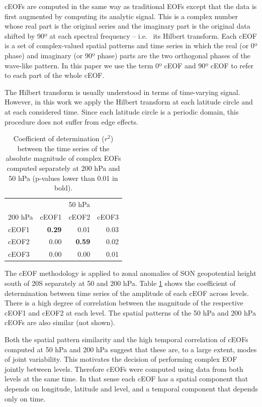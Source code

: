\documentclass[pdflatex,sn-basic]{sn-jnl}
\theoremstyle{thmstyleone}%
\theoremstyle{thmstyletwo}%
\theoremstyle{thmstylethree}%
\begin{document}
cEOFs are computed in the same way as traditional EOFs except that the data is first augmented by computing its analytic signal.
This is a complex number whose real part is the original series and the imaginary part is the original data shifted by 90º at each spectral frequency -- i.e.~
its Hilbert transform. Each cEOF is a set of complex-valued spatial patterns and time series in which the real (or 0º phase) and imaginary (or 90º phase) parts are the two orthogonal phases of the wave-like pattern.
In this paper we use the term 0º cEOF and 90º cEOF to refer to each part of the whole cEOF.

The Hilbert transform is usually understood in terms of time-varying signal.
However, in this work we apply the Hilbert transform at each latitude circle and at each considered time.
Since each latitude circle is a periodic domain, this procedure does not suffer from edge effects.



\begin{table}

\caption{\label{tab:corr-ceof-splitted}Coefficient of determination (\(r^2\)) between the time series of the absolute magnitude of complex EOFs computed separately at 200 hPa and 50 hPa (p-values lower than 0.01 in bold).}
\centering
\begin{tabular}[t]{l>{}r>{}r>{}r}
\toprule
\multicolumn{1}{c}{} & \multicolumn{3}{c}{50 hPa} \\
\cmidrule(l{3pt}r{3pt}){2-4}
200 hPa & cEOF1 & cEOF2 & cEOF3\\
\midrule
cEOF1 & \textbf{0.29} & 0.01 & 0.03\\
cEOF2 & 0.00 & \textbf{0.59} & 0.02\\
cEOF3 & 0.00 & 0.00 & 0.01\\
\bottomrule
\end{tabular}
\end{table}

The cEOF methodology is applied to zonal anomalies of SON geopotential height south of 20\degree S separately at 50 and 200 hPa.
Table \ref{tab:corr-ceof-splitted} shows the coefficient of determination between time series of the amplitude of each cEOF across levels.
There is a high degree of correlation between the magnitude of the respective cEOF1 and cEOF2 at each level.
The spatial patterns of the 50 hPa and 200 hPa cEOFs are also similar (not shown).

Both the spatial pattern similarity and the high temporal correlation of cEOFs computed at 50 hPa and 200 hPa suggest that these are, to a large extent, modes of joint variability.
This motivates the decision of performing complex EOF jointly between levels.
Therefore cEOFs were computed using data from both levels at the same time.
In that sense each cEOF has a spatial component that depends on longitude, latitude and level, and a temporal component that depends only on time.
\end{document}

